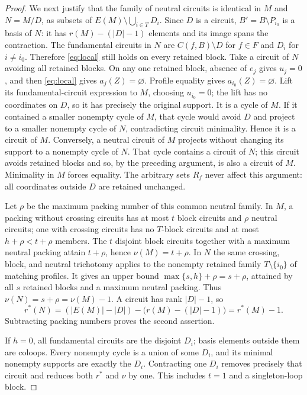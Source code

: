 \documentclass[11pt]{article}
\begin{document}
\begin{proof}
We next justify that the family of neutral circuits is identical in
$M$ and $N=M/D$, as subsets of $E(M)\setminus\bigcup_{i\in T}D_i$.
Since $D$ is a circuit, $B'=B\setminus P_{i_0}$ is a basis of $N$:
it has $r(M)-(|D|-1)$ elements and its image spans the contraction.
The fundamental circuits in $N$ are $C(f,B)\setminus D$ for $f\in F$
and $D_i$ for $i\ne i_0$.  Therefore \eqref{eq:local} still holds
on every retained block.  Take a circuit of $N$ avoiding all retained
blocks.  On any one retained block, absence of $e_j$ gives $u_j=0$,
and then \eqref{eq:local} gives $a_j(Z)=\varnothing$.  Profile equality
gives $a_{i_0}(Z)=\varnothing$.  Lift its fundamental-circuit
expression to $M$, choosing $u_{i_0}=0$; the lift has no coordinates
on $D$, so it has precisely the original support.  It is a cycle of
$M$.  If it contained a smaller nonempty cycle of $M$, that cycle
would avoid $D$ and project to a smaller nonempty cycle of $N$,
contradicting circuit minimality.  Hence it is a circuit of $M$.
Conversely, a neutral circuit of $M$ projects without changing its
support to a nonempty cycle of $N$.  That cycle contains a circuit of
$N$; this circuit avoids retained blocks and so, by the preceding
argument, is also a circuit of $M$.  Minimality in $M$ forces equality.
The arbitrary sets $R_f$ never affect this argument: all coordinates
outside $D$ are retained unchanged.

Let $\rho$ be the maximum packing number of this common neutral
family.  In $M$, a packing without crossing circuits has at most $t$
block circuits and $\rho$ neutral circuits; one with crossing circuits
has no $T$-block circuits and at most $h+\rho<t+\rho$ members.
The $t$ disjoint block circuits together with a maximum neutral
packing attain $t+\rho$, hence $\nu(M)=t+\rho$.  In $N$ the same
crossing, block, and neutral trichotomy applies to the nonempty
retained family $T\setminus\{i_0\}$ of matching profiles.  It gives
an upper bound $\max\{s,h\}+\rho=s+\rho$, attained by
all $s$ retained blocks and a maximum neutral packing.  Thus
$\nu(N)=s+\rho=\nu(M)-1$.  A circuit has rank $|D|-1$, so
\[
 r^*(N)=(|E(M)|-|D|)-\bigl(r(M)-(|D|-1)\bigr)=r^*(M)-1.
\]
Subtracting packing numbers proves the second assertion.

If $h=0$, all fundamental circuits are the disjoint $D_i$; basis
elements outside them are coloops.  Every nonempty cycle is a union
of some $D_i$, and its minimal nonempty supports are exactly the
$D_i$.  Contracting one $D_i$ removes precisely that circuit and
reduces both $r^*$ and $\nu$ by one.  This includes $t=1$ and a
singleton-loop block.
\end{proof}
\end{document}
